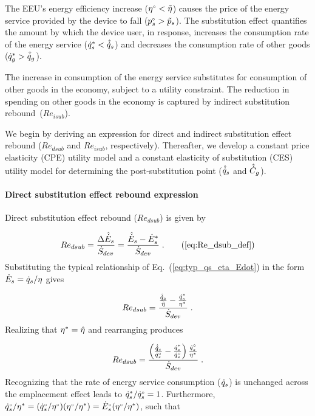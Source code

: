 The EEU's energy efficiency increase
(${}{\eta}^{\scriptscriptstyle \circ} < \tilde{\eta}$)
causes the price of the energy service provided by the device to fall
(${}{p}^{\scriptscriptstyle \circ}_s > \tilde{p}_s$).
The substitution effect quantifies the amount by which
the device user, in response,
increases the consumption rate of the energy service
(${\dot{q}}^*_s < \hat{\dot{q}}_s$)
and decreases the consumption rate of other goods
(${\dot{q}}^*_g > \hat{\dot{q}}_g$).

The increase in consumption of the energy service
substitutes for consumption of other goods in the economy,
subject to a utility constraint.
The reduction in spending on other goods in the economy
is captured by indirect substitution rebound~($Re_{isub}$).

We begin by deriving an expression for direct and indirect
substitution effect rebound ($Re_{dsub}$ and $Re_{isub}$, respectively).
Thereafter, we develop
a constant price elasticity (CPE) utility model and
a constant elasticity of substitution (CES) utility model
for determining the
post-substitution point ($\hat{\dot{q}}_s$ and $\hat{\dot{C}}_g$).


\paragraph{Direct substitution effect rebound expression}
\label{sec:Redsub_expression}

Direct substitution effect rebound ($Re_{dsub}$) is given by

\begin{equation}
  Re_{dsub} = \frac{\Delta \rasub{E}_s}{\Sdot} = \frac{\rasub{E}_s - \rbsub{E}_s}{\Sdot} \; . \tag{\ref{eq:Re_dsub_def}}
\end{equation}
%
Substituting the typical relationship of Eq.~(\ref{eq:typ_qs_eta_Edot})
in the form $\dot{E}_s = \dot{q}_s/\eta$ gives

\begin{equation}
  Re_{dsub} = \frac{\frac{\hat{\dot{q}}_s}{\hat{\eta}} - \frac{{\dot{q}}^*_s}{{\eta}^*}}{\dot{S}_{dev}} \; .
\end{equation}
%
Realizing that ${\eta}^* = \hat{\eta}$ and rearranging produces

\begin{equation}
  Re_{dsub} = \frac{ \left( \frac{\hat{\dot{q}}_s}{{}{\dot{q}}^{\scriptscriptstyle \circ}_s}
                    - \frac{{\dot{q}}^*_s}{{}{\dot{q}}^{\scriptscriptstyle \circ}_s}  \right) \frac{{}{\dot{q}}^{\scriptscriptstyle \circ}_s}{{\eta}^*} }{\dot{S}_{dev}} \; .
\end{equation}
%
Recognizing that the rate of energy service consumption ($\dot{q}_s$)
is unchanged across the emplacement effect leads to ${\dot{q}}^*_s/{}{\dot{q}}^{\scriptscriptstyle \circ}_s = 1$.
Furthermore, ${}{\dot{q}}^{\scriptscriptstyle \circ}_s/{\eta}^*
            = ({}{\dot{q}}^{\scriptscriptstyle \circ}_s/{}{\eta}^{\scriptscriptstyle \circ}) ({}{\eta}^{\scriptscriptstyle \circ}/{\eta}^*)
            = {}{\dot{E}}^{\scriptscriptstyle \circ}_s ({}{\eta}^{\scriptscriptstyle \circ}/{\eta}^*)$,
such that

